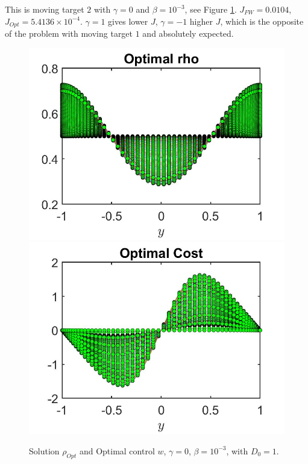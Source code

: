 \documentclass[11pt, a4paper]{article}
\theoremstyle{definition}
\begin{document}
This is moving target $2$ with $\gamma =0$ and $\beta = 10^{-3}$, see Figure \ref{rhog2}. $J_{FW} = 0.0104$, $J_{Opt} = 5.4136 \times 10^{-4}$. $\gamma =1$ gives lower $J$, $\gamma = -1$ higher $J$, which is the opposite of the problem with moving target $1$ and absolutely expected.
	\begin{figure}[h]
		\includegraphics[scale=0.3]{rhoOptg2.jpg}
		\includegraphics[scale=0.3]{wOptg2.jpg}
		\caption{Solution $\rho_{Opt}$ and Optimal control $w$, $\gamma = 0$, $\beta = 10^{-3}$, with $D_0 = 1$.}
		\label{rhog2}
	\end{figure}
	
\end{document}
